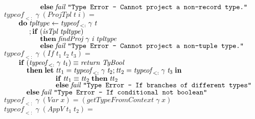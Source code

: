 \documentclass[10pt]{article}
\newcommand{\Conid}[1]{\mathit{#1}}
\newcommand{\Varid}[1]{\mathit{#1}}
\begin{document}
\begin{tabbing}
${\hskip2.00em\relax\phantom{\mathbf{do}\;\mbox{}}\phantom{;\mathbf{if}\;\mbox{}}\mathbf{else}\;\Varid{fail}\;\text{\tt \char34 Type~Error~-~Cannot~project~a~non-record~type.\char34}}$\\
${\Varid{typeof}_{<:}\;\Varid{\gamma}\;(\Conid{ProjTpl}\;\Varid{t}\;\Varid{i})\mathrel{=}}$\\
${\hskip2.00em\relax\mathbf{do}\;\Varid{tpltype}\leftarrow \Varid{typeof}_{<:}\;\Varid{\gamma}\;\Varid{t}}$\\
${\hskip2.00em\relax\phantom{\mathbf{do}\;\mbox{}};\mathbf{if}\;(\Varid{isTpl}\;\Varid{tpltype})}$\\
${\hskip2.00em\relax\phantom{\mathbf{do}\;\mbox{}}\phantom{;\mathbf{if}\;\mbox{}}\mathbf{then}\;\Varid{findProj}\;\Varid{\gamma}\;\Varid{i}\;\Varid{tpltype}}$\\
${\hskip2.00em\relax\phantom{\mathbf{do}\;\mbox{}}\phantom{;\mathbf{if}\;\mbox{}}\mathbf{else}\;\Varid{fail}\;\text{\tt \char34 Type~Error~-~Cannot~project~a~non-tuple~type.\char34}}$\\
${\Varid{typeof}_{<:}\;\Varid{\gamma}\;(\Conid{If}\;\Varid{t}_1\;\Varid{t}_2\;\Varid{t}_3)\mathrel{=}}$\\
${\hskip2.00em\relax\mathbf{if}\;(\Varid{typeof}_{<:}\;\Varid{\gamma}\;\Varid{t}_1)\equiv \Varid{return}\;\Conid{TyBool}}$\\
${\hskip2.00em\relax\phantom{\mathbf{if}\;\mbox{}}\mathbf{then}\;\mathbf{let}\;\Varid{tt}_1\mathrel{=}\Varid{typeof}_{<:}\;\Varid{\gamma}\;\Varid{t}_2;\Varid{tt}_2\mathrel{=}\Varid{typeof}_{<:}\;\Varid{\gamma}\;\Varid{t}_3\;\mathbf{in}}$\\
${\hskip2.00em\relax\phantom{\mathbf{if}\;\mbox{}}\phantom{\mathbf{then}\;\mathbf{let}\;\mbox{}}\mathbf{if}\;\Varid{tt}_1\equiv \Varid{tt}_2\;\mathbf{then}\;\Varid{tt}_2}$\\
${\hskip2.00em\relax\phantom{\mathbf{if}\;\mbox{}}\phantom{\mathbf{then}\;\mathbf{let}\;\mbox{}}\mathbf{else}\;\Varid{fail}\;\text{\tt \char34 Type~Error~-~If~branches~of~different~types\char34}}$\\
${\hskip2.00em\relax\phantom{\mathbf{if}\;\mbox{}}\mathbf{else}\;\Varid{fail}\;\text{\tt \char34 Type~Error~-~If~conditional~not~boolean\char34}}$\\
${\Varid{typeof}_{<:}\;\Varid{\gamma}\;(\Conid{Var}\;\Varid{x})\mathrel{=}(\Varid{getTypeFromContext}\;\Varid{\gamma}\;\Varid{x})}$\\
${\Varid{typeof}_{<:}\;\Varid{\gamma}\;(\Conid{AppV}\;\Varid{t}_1\;\Varid{t}_2)\mathrel{=}}$\\

\end{tabbing}
\end{document}

